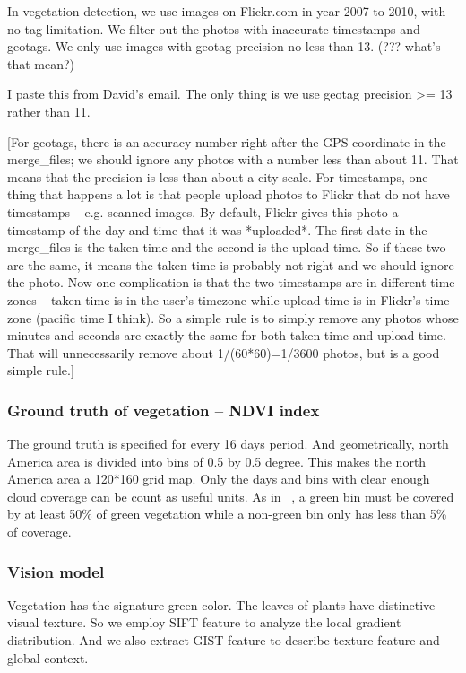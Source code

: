 



In vegetation detection, we use images on Flickr.com in year 2007 to 2010, with no tag limitation. We filter out the photos with inaccurate timestamps and geotags. We only use images with geotag precision no less than 13. (??? what's that mean?) 

I paste this from David's email. The only thing is we use geotag precision >= 13 rather than 11. 

[For geotags, there is an
accuracy number right after the GPS coordinate in the merge\_files; we
should ignore any photos with a number less than about 11. That means
that the precision is less than about a city-scale. For timestamps,
one thing that happens a lot is that people upload photos to Flickr
that do not have timestamps -- e.g. scanned images. By default, Flickr
gives this photo a timestamp of the day and time that it was
*uploaded*. The first date in the merge\_files is the taken time and
the second is the upload time. So if these two are the same, it means
the taken time is probably not right and we should ignore the photo.
Now one complication is that the two timestamps are in different time
zones -- taken time is in the user's timezone while upload time is in
Flickr's time zone (pacific time I think). So a simple rule is to
simply remove any photos whose minutes and seconds are exactly the
same for both taken time and upload time. That will unnecessarily
remove about 1/(60*60)=1/3600 photos, but is a good simple rule.]




\subsubsection*{Ground truth of vegetation -- NDVI index}
The ground truth is specified for every 16 days period. 
And geometrically, north America area is divided into bins of 0.5 by 0.5 degree. This makes the north America area a 120*160 grid map.
Only the days and bins with clear enough cloud coverage can be count as useful units. As in ~\cite{www paper}, a green bin must be covered by at least 50\% of green vegetation while a non-green bin only has less than 5\% of coverage.


\subsubsection*{Vision model}
Vegetation has the signature green color. The leaves of plants have distinctive visual texture. So we employ SIFT feature to analyze the local gradient distribution. And we also extract GIST feature to describe texture feature and global context. 






